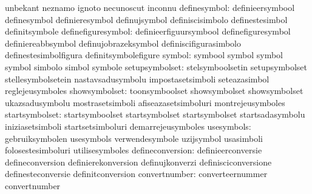                                   unbekant                         neznamo
                                  ignoto                           necunoscut
                                  inconnu
                    definesymbol: definieersymbool                 definesymbol
                                  definieresymbol                  definujsymbol
                                  definiscisimbolo                 definestesimbol
                                  definitsymbole
              definefiguresymbol: definieerfiguursymbool           definefiguresymbol
                                  definiereabbsymbol               definujobrazeksymbol
                                  definiscifigurasimbolo           definestesimbolfigura
                                  definitsymbolefigure
                          symbol: symbool                          symbol
                                  symbol                           symbol
                                  simbolo                          simbol
                                  symbole
                  setupsymbolset: stelsymboolsetin                 setupsymbolset
                                  stellesymbolsetein               nastavsadusymbolu
                                  impostasetsimboli                seteazasimbol
                                  reglejeusymboles
                   showsymbolset: toonsymboolset                   showsymbolset
                                  showsymbolset                    ukazsadusymbolu
                                  mostrasetsimboli                 afiseazasetsimboluri
                                  montrejeusymboles
                  startsymbolset: startsymboolset                  startsymbolset
                                  startsymbolset                   startsadasymbolu
                                  iniziasetsimboli                 startsetsimboluri
                                  demarrejeusymboles
                      usesymbols: gebruiksymbolen                  usesymbols
                                  verwendesymbole                  uzijsymbol
                                  usasimboli                       folosestesimboluri
                                  utilisesymboles
                defineconversion: definieerconversie               defineconversion
                                  definierekonversion              definujkonverzi
                                  definisciconversione             definesteconversie
                                  definitconversion
                   convertnumber: converteernummer                 convertnumber
